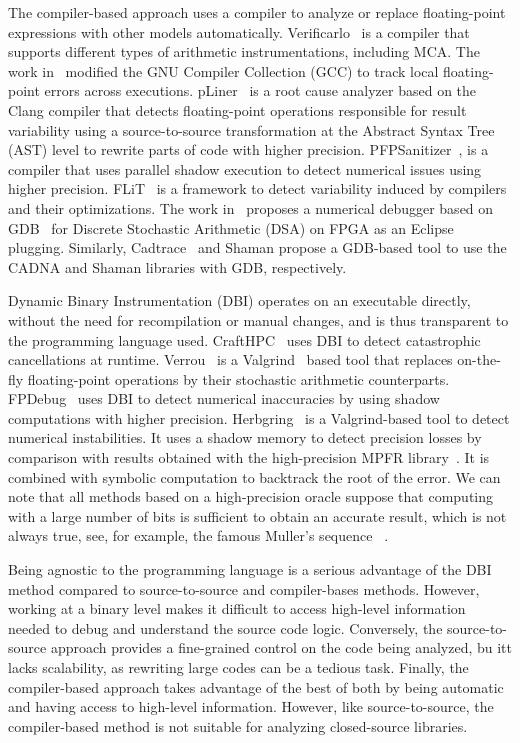 \documentclass[11pt]{article}
\begin{document}
The compiler-based approach uses a compiler to analyze or replace floating-point expressions with other models automatically. 
Verificarlo~\cite{verificarlo} is a compiler that supports different types of arithmetic instrumentations, including MCA. 
The work in~\cite{bao2013fly} modified the GNU Compiler Collection (GCC) to track local floating-point errors across executions. pLiner~\cite{guo2020pliner} is a root cause analyzer based on the Clang compiler that detects floating-point operations responsible for result variability using a source-to-source transformation at the Abstract Syntax Tree (AST)  level to rewrite parts of code with higher precision. 
PFPSanitizer~\cite{chowdhary2020debugging,chowdhary2021parallel}, is a compiler that uses parallel shadow execution to detect numerical issues using higher precision.
FLiT~\cite{sawaya2017flit} is a framework to detect variability induced by compilers and their optimizations.
The work in~\cite{wang2012development} proposes a numerical debugger based on GDB~\cite{stallman1988debugging} for Discrete Stochastic Arithmetic (DSA) on FPGA as an Eclipse plugging. Similarly, Cadtrace~\cite{jezequel2008cadna} and Shaman propose a GDB-based tool to use the CADNA and Shaman libraries with GDB, respectively.

Dynamic Binary Instrumentation (DBI) operates on an executable directly, without the need for recompilation or manual changes, and is thus
transparent to the programming language used. 
CraftHPC~\cite{lam2013dynamic} uses DBI to detect catastrophic cancellations at runtime.
Verrou~\cite{fevotte2016verrou} is a Valgrind~\cite{nethercote2007valgrind} based tool that replaces on-the-fly
floating-point operations by their stochastic arithmetic counterparts. FPDebug~\cite{benz2012dynamic} uses DBI to detect numerical inaccuracies by using shadow computations with higher precision.
Herbgring~\cite{sanchez2017finding} is a Valgrind-based tool to detect
numerical instabilities. It uses a shadow memory to detect precision losses by comparison with results obtained with the high-precision 
MPFR library~\cite{fousse2007mpfr}. It is combined with symbolic computation to backtrack the root of the error.
We can note that all methods based on a high-precision oracle suppose that computing with a large number of bits is sufficient to obtain an accurate result, which is not always true, see, for example, the famous Muller's sequence ~\cite{chatelain2018veritracer}.

Being agnostic to the programming language is a serious advantage of the DBI method compared to source-to-source and compiler-bases methods. However, working at a binary level makes it difficult to access high-level information needed to debug and understand the source code logic. Conversely, the source-to-source approach provides a fine-grained control on the code being analyzed, bu itt lacks scalability, as rewriting large codes can be a tedious task. Finally, the compiler-based approach takes advantage of the best of both by being automatic and having access to high-level information. However, like source-to-source, the compiler-based method is not suitable for analyzing closed-source libraries.
\end{document}
